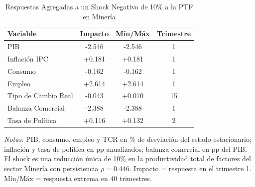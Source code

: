 \begin{table}[htbp]
\centering
\caption{Respuestas Agregadas a un Shock Negativo de 10\% a la PTF en Minería}
\label{tab:min_agg}
\begin{threeparttable}
\begin{tabular}{@{}l c c c@{}}
\toprule
Variable & Impacto & Mín/Máx & Trimestre \\
\midrule
PIB & -2.546 & -2.546 & 1 \\
Inflación IPC & +0.181 & +0.181 & 1 \\
Consumo & -0.162 & -0.162 & 1 \\
Empleo & +2.614 & +2.614 & 1 \\
Tipo de Cambio Real & -0.043 & +0.070 & 15 \\
Balanza Comercial & -2.388 & -2.388 & 1 \\
Tasa de Política & +0.116 & +0.132 & 2 \\
\bottomrule
\end{tabular}
\begin{tablenotes}[flushleft]
\footnotesize
\item \textit{Notas:} PIB, consumo, empleo y TCR en \% de desviación del estado estacionario; inflación y tasa de política en pp anualizados; balanza comercial en pp del PIB. El shock es una reducción única de 10\% en la productividad total de factores del sector Minería con persistencia $\rho = 0.446$. Impacto = respuesta en el trimestre 1. Mín/Máx = respuesta extrema en 40 trimestres.
\end{tablenotes}
\end{threeparttable}
\end{table}

